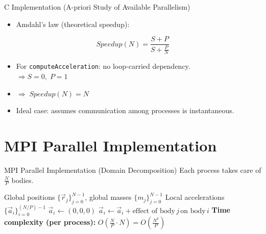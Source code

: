 \documentclass{beamer}
\begin{document}
\begin{frame}{C Implementation (A-priori Study of Available Parallelism)}
\begin{itemize}
	\item Amdahl's law (theoretical speedup):
\end{itemize}

\[
Speedup(N) = \frac{S+P}{S + \tfrac{P}{N}}
\]
\begin{itemize}
  \item For \texttt{computeAcceleration}: no loop-carried dependency. \\
        $\Rightarrow S=0,\; P=1$
  \item $\Rightarrow \; Speedup(N) = N$
  \item Ideal case: assumes communication among processes is instantaneous.
\end{itemize}
\end{frame}

\section{MPI Parallel Implementation}

\begin{frame}{MPI Parallel Implementation (Domain Decomposition)}
Each process takes care of $\frac{N}{P}$ bodies.
\begin{algorithm}[H]
\caption{Parallel inner loop: compute local accelerations}
\label{alg:parallel_inner_loop}
\begin{algorithmic}[1]
\Require Global positions $\{\vec r_j\}_{j=0}^{N-1}$, global masses $\{m_j\}_{j=0}^{N-1}$
\Ensure Local accelerations $\{\vec a_i\}_{i=0}^{(N/P)-1}$
  \State $\vec a_i \gets (0,0,0)$
      \State $\vec a_i \gets \vec a_i + \text{effect of body}\, j \, \text{on body}\, i$
    \EndIf
  \EndFor
\EndFor
\Statex \textbf{Time complexity (per process):} $O\!\left(\frac{N}{P} \cdot N\right) = O\!\left(\frac{N^2}{P}\right)$
\end{algorithmic}
\end{algorithm}
\end{frame}
\end{document}
